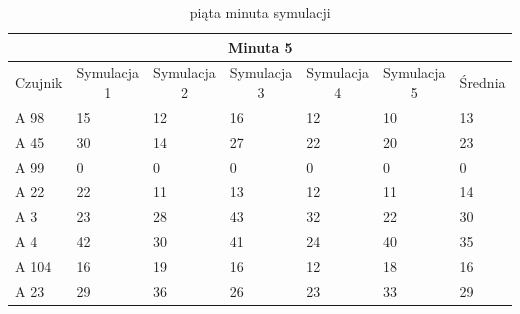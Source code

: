 \documentclass[a4paper,12pt]{article}
\begin{document}
\begin{table}[!h]
	\centering

\begin{tabular}{|l|l|l|l|l|l|l|}
\hline
\multicolumn{7}{|c|}{Minuta 5}                                                                                                                                                                                                                   \\ \hline
\multicolumn{1}{|c|}{Czujnik} & \multicolumn{1}{c|}{Symulacja 1} & \multicolumn{1}{c|}{Symulacja 2} & \multicolumn{1}{c|}{Symulacja 3} & \multicolumn{1}{c|}{Symulacja 4} & \multicolumn{1}{c|}{Symulacja 5} & \multicolumn{1}{c|}{Średnia} \\ \hline
A 98                          & 15                               & 12                               & 16                              & 12                             & 10                             & 13                                     \\ \hline
A 45                          & 30                               & 14                               & 27                              & 22                             & 20                             & 23                                     \\ \hline
A 99                          & 0                                & 0                                & 0                               & 0                              & 0                              & 0                                      \\ \hline
A 22                          & 22                               & 11                               & 13                              & 12                             & 11                             & 14                                     \\ \hline
A 3                           & 23                               & 28                               & 43                              & 32                             & 22                             & 30                                     \\ \hline
A 4                           & 42                               & 30                               & 41                              & 24                             & 40                             & 35                                     \\ \hline
A 104                         & 16                               & 19                               & 16                              & 12                             & 18                             & 16                                     \\ \hline
A 23                          & 29                               & 36                               & 26                              & 23                             & 33                             & 29                                     \\ \hline
\end{tabular}
\caption{piąta minuta symulacji}
\label{tab:5}
\end{table}
\end{document}
